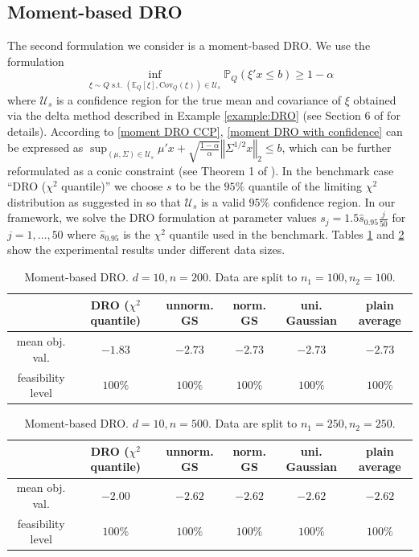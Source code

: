 \documentclass[mnsc,blindrev]{informs4} %
\newcommand{\norm}[1]{\left \Vert #1 \right\Vert}
\begin{document}
\subsection{Moment-based DRO}
The second formulation we consider is a moment-based DRO. We use the formulation
\begin{equation}\label{moment DRO with confidence}
\inf_{\xi\sim Q\text{ s.t. }(\mathbb E_Q[\xi],\mathrm{Cov}_{Q}(\xi))\in\mathcal U_{s}}\mathbb P_Q(\xi'x\leq b)\geq 1-\alpha
\end{equation}
where $\mathcal U_s$ is a confidence region for the true mean and covariance of $\xi$ obtained via the delta method described in Example \ref{example:DRO} (see Section 6 of \cite{marandi2019extending} for details). According to \eqref{moment DRO CCP}, \eqref{moment DRO with confidence} can be expressed as $\sup_{(\mu,\Sigma)\in\mathcal U_{s}}\mu'x+\sqrt{\frac{1-\alpha}{\alpha}}\norm{\Sigma^{1/2}x}_2\leq b$, which can be further reformulated as a conic constraint (see Theorem 1 of \cite{marandi2019extending}). In the benchmark case ``DRO ($\chi^2$ quantile)'' we choose $s$ to be the $95\%$ quantile of the limiting $\chi^2$ distribution as suggested in \cite{marandi2019extending} so that $\mathcal U_s$ is a valid $95\%$ confidence region. In our framework, we solve the DRO formulation at parameter values $s_j=1.5\hat s_{0.95}\frac{j}{50}$ for $j=1,\ldots,50$ where $\hat s_{0.95}$ is the $\chi^2$ quantile used in the benchmark. Tables \ref{DRO_10_200} and \ref{DRO_10_500} show the experimental results under different data sizes.
\begin{table}[h]
\caption{Moment-based DRO. $d=10,n=200$. Data are split to $n_1=100,n_2=100$.}
\begin{center}
\begin{tabular}{|c|c|c|c|c|c|}
\hline
&DRO ($\chi^2$ quantile)&unnorm. GS&norm. GS&uni. Gaussian&plain average\\\hline
mean obj. val.&$-1.83$&$-2.73$&$-2.73$&$-2.73$&$-2.73$\\\hline
feasibility level&$100\%$&$100\%$&$100\%$&$100\%$&$100\%$\\\hline
\end{tabular}
\end{center}
\label{DRO_10_200}
\end{table}%

\begin{table}[h]
\caption{Moment-based DRO. $d=10,n=500$. Data are split to $n_1=250,n_2=250$.}
\begin{center}
\begin{tabular}{|c|c|c|c|c|c|}
\hline
&DRO ($\chi^2$ quantile)&unnorm. GS&norm. GS&uni. Gaussian&plain average\\\hline
mean obj. val.&$-2.00$&$-2.62$&$-2.62$&$-2.62$&$-2.62$\\\hline
feasibility level&$100\%$&$100\%$&$100\%$&$100\%$&$100\%$\\\hline
\end{tabular}
\end{center}
\label{DRO_10_500}
\end{table}%
\end{document}
